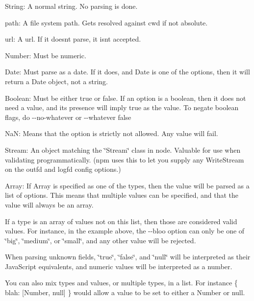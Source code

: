 \begin{DoxyItemize}
\item String\+: A normal string. No parsing is done.
\item path\+: A file system path. Gets resolved against cwd if not absolute.
\item url\+: A url. If it doesn\textquotesingle{}t parse, it isn\textquotesingle{}t accepted.
\item Number\+: Must be numeric.
\item Date\+: Must parse as a date. If it does, and {\ttfamily Date} is one of the options, then it will return a Date object, not a string.
\item Boolean\+: Must be either {\ttfamily true} or {\ttfamily false}. If an option is a boolean, then it does not need a value, and its presence will imply {\ttfamily true} as the value. To negate boolean flags, do {\ttfamily -\/-\/no-\/whatever} or {\ttfamily -\/-\/whatever false}
\item Na\+N\+: Means that the option is strictly not allowed. Any value will fail.
\item Stream\+: An object matching the \char`\"{}\+Stream\char`\"{} class in node. Valuable for use when validating programmatically. (npm uses this to let you supply any Write\+Stream on the {\ttfamily outfd} and {\ttfamily logfd} config options.)
\item Array\+: If {\ttfamily Array} is specified as one of the types, then the value will be parsed as a list of options. This means that multiple values can be specified, and that the value will always be an array.
\end{DoxyItemize}

If a type is an array of values not on this list, then those are considered valid values. For instance, in the example above, the {\ttfamily -\/-\/bloo} option can only be one of {\ttfamily \char`\"{}big\char`\"{}}, {\ttfamily \char`\"{}medium\char`\"{}}, or {\ttfamily \char`\"{}small\char`\"{}}, and any other value will be rejected.

When parsing unknown fields, {\ttfamily \char`\"{}true\char`\"{}}, {\ttfamily \char`\"{}false\char`\"{}}, and {\ttfamily \char`\"{}null\char`\"{}} will be interpreted as their Java\+Script equivalents, and numeric values will be interpreted as a number.

You can also mix types and values, or multiple types, in a list. For instance {\ttfamily \{ blah\+: \mbox{[}Number, null\mbox{]} \}} would allow a value to be set to either a Number or null.

